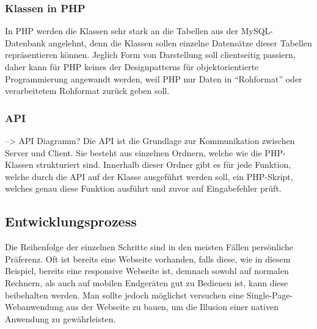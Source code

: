 \documentclass[a4paper,12pt,ngerman,listof=numbered]{scrartcl}      %
\let\oldcite\cite
\renewcommand{\cite}[1]{\textsuperscript{\oldcite{#1}}}
\begin{document}
	\subsubsection{Klassen in PHP}
	In PHP werden die Klassen sehr stark an die Tabellen aus der MySQL-Datenbank angelehnt, denn die Klassen sollen einzelne Datensätze dieser Tabellen repräsentieren können. Jeglich Form von Darstellung soll clientseitig passiern, daher kann für PHP keines der Designpatterns für objektorientierte Programmierung angewandt werden, weil PHP nur Daten in ``Rohformat'' oder verarbeitetem Rohformat zurück geben soll.\par
	
	\subsubsection{API}
	--> API Diagramm?
	Die API ist die Grundlage zur Kommunikation zwischen Server und Client. Sie besteht aus einzelnen Ordnern, welche wie die PHP-Klassen strukturiert sind. Innerhalb dieser Ordner gibt es für jede Funktion, welche durch die API auf der Klasse ausgeführt werden soll, ein PHP-Skript, welches genau diese Funktion ausführt und zuvor auf Eingabefehler prüft.\par
	
	\subsection{Entwicklungsprozess}
	Die Reihenfolge der einzelnen Schritte sind in den meisten Fällen persönliche Präferenz. Oft ist bereits eine Webseite vorhanden, falls diese, wie in diesem Beispiel, bereits eine responsive Webseite ist, demnach sowohl auf normalen Rechnern, als auch auf mobilen Endgeräten gut zu Bedienen ist, kann diese beibehalten werden. Man sollte jedoch möglichst versuchen eine Single-Page-Webanwendung\cite{singlePageWiki} aus der Webseite zu bauen, um die Illusion einer nativen Anwendung zu gewährleisten.\par
	
\end{document}
